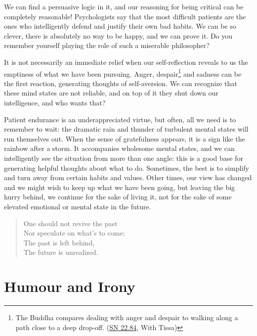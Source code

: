 \clearpage

We can find a persuasive logic in it, and our reasoning for being
critical can be completely reasonable! Psychologists say that the most
difficult patients are the ones who intelligently defend and justify
their own bad habits. We can be so clever, there is absolutely no way to
be happy, and we can prove it. Do you remember yourself playing the role
of such a miserable philosopher?

It is not necessarily an immediate relief when our self-reflection
reveals to us the emptiness of what we have been pursuing. Anger,
despair\footnote{The Buddha compares dealing with anger and despair to
  walking along a path close to a deep drop-off.
  (\href{https://suttacentral.net/sn22.84}{SN 22.84}, With Tissa)} and
sadness can be the first reaction, generating thoughts of self-aversion.
We can recognize that these mind states are not reliable, and on top of
it they shut down our intelligence, and who wants that?


Patient endurance is an underappreciated virtue, but often, all we need
is to remember to wait: the dramatic rain and thunder of turbulent
mental states will run themselves out. When the sense of gratefulness
appears, it is a sign like the rainbow after a storm. It accompanies
wholesome mental states, and we can intelligently see the situation from
more than one angle: this is a good base for generating helpful thoughts
about what to do. Sometimes, the best is to simplify and turn away from
certain habits and values. Other times, our view has changed and we
might wish to keep up what we have been going, but leaving the big hurry
behind, we continue for the sake of living it, not for the sake of some
elevated emotional or mental state in the future.

\begin{quote}
One should not revive the past\\
Nor speculate on what's to come;\\
The past is left behind,\\
The future is unrealized.

\bigskip

\end{quote}

\section{Humour and Irony}

